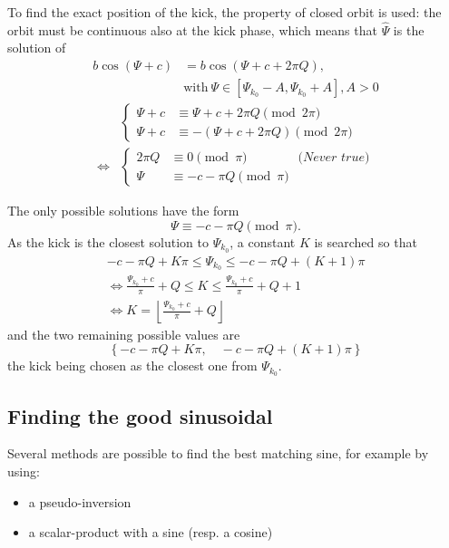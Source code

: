 To find the exact position of the kick, the property of closed orbit is used: the orbit must be continuous also at the kick phase, which means that $\hat{\Psi}$ is the solution of
\begin{align}
b \cos(\Psi + c) &= b\cos(\Psi+c+2 \pi Q),\\
& \mathrm{with}~ \Psi \in [\Psi_{k_0}-A, \Psi_{k_0}+A] , A>0 \nonumber
\end{align}
\begin{align}
&\begin{cases}
\Psi + c &\equiv \Psi + c + 2 \pi Q \pmod{2 \pi} \\
\Psi + c &\equiv - (\Psi + c + 2 \pi Q) \pmod{2 \pi}
\end{cases} \nonumber\\
\iff &\begin{cases}
2 \pi Q &\equiv 0\pmod \pi \qquad\qquad\textit{(Never true)}\\
\Psi &\equiv -c - \pi Q  \pmod \pi
\end{cases} \nonumber
\end{align}

The only possible solutions have the form
\begin{equation}
 \Psi \equiv - c - \pi Q \pmod \pi.
\end{equation}
As the kick is the closest solution to $\Psi_{k_0}$, a constant $K$ is searched so that
\begin{gather}
 -c - \pi Q + K \pi  \leq \Psi_{k_0} \leq -c -\pi Q + (K+1) \pi \nonumber \\
\iff \frac{\Psi_{k_0} + c}{\pi} + Q \leq K \leq \frac{\Psi_{k_0} + c}{\pi} + Q + 1 \nonumber \\
\iff K = \left\lfloor  \frac{\Psi_{k_0}+c}{\pi} + Q \right\rfloor 
\end{gather}
and the two remaining possible values are
\begin{equation}
\left\lbrace - c - \pi Q+ K \pi , \quad - c - \pi Q + (K+1) \pi\right\rbrace
\end{equation}
the kick being chosen as the closest one from $\Psi_{k_0}$.

\subsection{Finding the good sinusoidal}
Several methods are possible to find the best matching sine, for example by using:
\begin{itemize}
	\item a pseudo-inversion
	\item a scalar-product with a sine (resp. a cosine)
\end{itemize}

